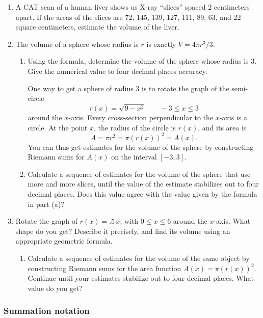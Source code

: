 \begin{enumerate}
\item A CAT scan of a human liver shows us X-ray ``slices'' spaced 2
centimeters apart.  If the areas of the slices are 72, 145, 139, 127,
111, 89, 63, and 22 square centimeters, estimate the volume of the
liver.


\item The volume of a sphere whose radius is $r$ is exactly $V = 4 \pi
r^3 / 3$.

  \begin{enumerate}
  \item Using the formula, determine the volume of the sphere whose
radius is 3.  Give the numerical value to four decimal places
accuracy.





One way to get a sphere of radius 3 is to rotate the graph of the semi-circle
	\[
r(x) = \sqrt{9 - x^2} \qquad -3 \leq x \leq 3
\]
around the $x$-axis.  Every cross-section perpendicular to the $x$-axis is a circle.  At the point $x$, the radius of the circle is $r(x)$, and its area is
	\[
A = \pi r^2 = \pi (r(x))^2 = A(x).
\]
You can thus get estimates for the volume of the sphere by constructing Riemann sums for $A(x)$ on the interval 
$[-3, 3]$.

  \item Calculate a sequence of estimates for the volume of the sphere
that use more and more slices, until the value of the estimate
stabilizes out to four decimal places.  Does this value agree with the
value given by the formula in part (a)?


\end{enumerate}
\item Rotate the graph of $r(x) = .5\,x$, with $0 \leq x \leq 6$
around the $x$-axis.  What shape do you get?  Describe it precisely,
and find its volume using an appropriate geometric formula.

  \begin{enumerate}
  \item Calculate a sequence of estimates for the volume of the same
object by constructing Riemann sums for the area function $A(x) = \pi
(r(x))^2$.  Continue until your estimates stabilize out to four
decimal places.  What value do you get?


\end{enumerate}
\end{enumerate}
\subsubsection{Summation notation}
\label{subsubsec:summation-notation}



